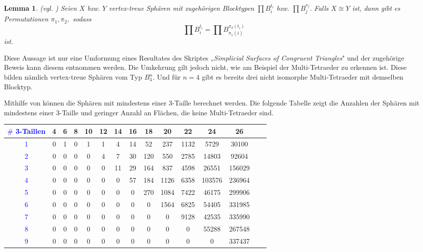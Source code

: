\documentclass[12pt,titlepage,twoside,cleardoublepage]{article}
\theoremstyle{nummermitklammern}
\newtheorem{lemma}[temp]{Lemma}
\newtheorem{lemma}[zahl]{Lemma}
\numberwithin{equation}{section}
\begin{document}
\begin{lemma}{\textsc{(}vgl. \textsc{\cite{simp})}}
Seien $X$ bzw. $Y$ vertex-treue Sphären mit zugehörigen Blocktypen $\prod B_i^{t_i}$ bzw. $\prod B_j^{s_j}.$ Falls $X\cong Y$ ist, dann gibt es Permutationen $\pi_1,\pi_2,$ sodass 
\[
\prod B_i^{t_i}=\prod B_{\pi_1(i)}^{\pi_2(t_i)}
\]  
ist.
\end{lemma}
Diese Aussage ist nur eine Umformung eines Resultates des Skriptes „\emph{Simplicial Surfaces of Congruent Triangles}"$ $ und der zugehörige Beweis kann diesem entnommen werden. Die Umkehrung gilt jedoch nicht, wie am Beispiel der Multi-Tetraeder zu erkennen ist. Diese bilden nämlich vertex-treue Sphären vom Typ $B_4^n.$ Und für $n=4$ gibt es bereits drei nicht isomorphe Multi-Tetraeder mit demselben Blocktyp.

Mithilfe von \cite{gapsimp} können die Sphären mit mindestens einer 3-Taille berechnet werden. Die folgende Tabelle zeigt die Anzahlen der Sphären mit mindestens einer 3-Taille und geringer Anzahl an Flächen, die keine Multi-Tetraeder sind. 
\begin{center}
\begin{tabular}{|c|c|c|c|c|c|c|c|c|c|c|c|c|c|c|}
\hline
\textcolor{blue}{$\#$ 3-Taillen }&\textbf{4}& \textbf{6}& \textbf{8}& \textbf{10}& \textbf{12}& \textbf{14}& \textbf{16}& \textbf{18}& \textbf{20}& \textbf{22}& \textbf{24}& \textbf{26}\\
\hline
\textcolor{blue}{1} &0& 1& 0& 1& 1& 4& 14& 52& 237& 1132& 5729& 30100\\
\hline
\textcolor{blue}{2} &0& 0& 0 &0& 4& 7& 30& 120& 550& 2785& 14803& 92604\\
\hline
\textcolor{blue}{3}& 0& 0& 0& 0& 0& 11& 29& 164& 837& 4598& 26551& 156029\\
\hline
\textcolor{blue}{4}& 0& 0& 0& 0& 0& 0& 57& 184& 1126& 6358& 103576& 236964\\
\hline
\textcolor{blue}{5}& 0& 0& 0& 0& 0& 0& 0& 270& 1084& 7422& 46175& 299906\\
\hline
\textcolor{blue}{6} &0& 0& 0& 0& 0& 0& 0& 0 &1564& 6825& 54405& 331985\\
\hline
\textcolor{blue}{7}& 0& 0& 0& 0& 0& 0& 0& 0& 0& 9128& 42535& 335990\\
\hline
\textcolor{blue}{8}& 0& 0& 0& 0& 0& 0& 0& 0& 0& 0& 55288& 267548\\
\hline
\textcolor{blue}{9} &0& 0& 0& 0& 0& 0& 0& 0& 0& 0& 0& 337437\\
\hline
\end{tabular}
\end{center}
\end{document}

